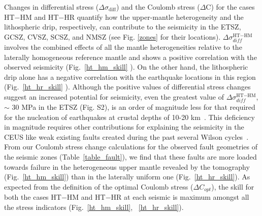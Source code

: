 \documentclass[draft,linenumbers]{agujournal2018}
\begin{document}
Changes in differential stress ($\Delta \sigma_{\text{diff}}$) and the Coulomb stress ($\Delta$C) for the cases HT$-$HM and HT$-$HR quantify how the upper-mantle heterogeneity and the lithospheric drip, respectively, can contribute to the seismicity in the ETSZ, GCSZ, CVSZ, SCSZ, and NMSZ (see Fig. \ref{zones} for their locations).
$\Delta\sigma_{diff}^{\text{HT}-\text{HM}}$ involves the combined effects of all the mantle heterogeneities relative to the laterally homogeneous reference mantle and shows a positive correlation with the observed seismicity  (Fig.~\ref{ht_hm_skill} ). On the other hand, the lithospheric drip alone has a negative correlation with the earthquake locations in this region (Fig.~\ref{ht_hr_skill} ). Although the positive values of differential stress changes suggest an increased potential for seismicity, even the greatest value of $\Delta\sigma_{diff}^{\text{HT}-\text{HM}}$, $\sim$ 30 MPa in the ETSZ (Fig. S2), is an order of magnitude less for that required for the nucleation of earthquakes at crustal depths of 10-20 km~\citep[e.g.][]{sibson1990rupture}. This deficiency in magnitude requires other contributions for explaining the seismicity in the CEUS like weak existing faults created during the past several Wilson cycles~\citep{thomas2006tectonic}. From our Coulomb stress change calculations for the observed fault geometries of the seismic zones (Table~\ref{table_fault}), we find that these faults are more loaded towards failure  in the heterogeneous upper mantle revealed by the tomography (Fig.~\ref{ht_hm_skill})  than in the laterally uniform one (Fig.~\ref{ht_hr_skill}). As expected from the definition of the optimal Coulomb stress ($\Delta C_{opt}$), the skill for both the cases HT$-$HM and HT$-$HR at each seismic is maximum amongst all the stress indicators (Fig.~\ref{ht_hm_skill}, ~\ref{ht_hr_skill}). 
       
    
    
\end{document}
